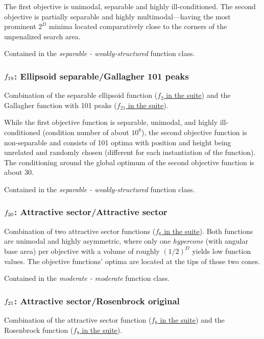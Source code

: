\documentclass[letterpaper,12pt,english]{article}
\begin{document}
The first objective is unimodal, separable and highly ill-conditioned.
The second objective is partially separable and highly multimodal---having
the most prominent \(2^D\) minima located comparatively close to the
corners of the unpenalized search area.

Contained in the \emph{separable - weakly-structured} function class.


\subsubsection{\protect\(f_{19}\protect\): Ellipsoid separable/Gallagher 101 peaks}
\label{index:ellipsoid-separable-gallagher-101-peaks}\label{index:f19}
Combination of the separable ellipsoid function (\href{http://coco.lri.fr/downloads/download15.03/bbobdocfunctions.pdf\#page=10}{\(f_2\) in the  suite}) and the Gallagher function with 101 peaks (\href{http://coco.lri.fr/downloads/download15.03/bbobdocfunctions.pdf\#page=105}{\(f_{21}\) in the  suite}).

While the first objective function is separable, unimodal, and
highly ill-conditioned (condition number of about \(10^6\)),
the second objective function is non-separable and consists
of 101 optima with position and height being unrelated and
randomly chosen (different for each instantiation of the function).
The conditioning around the global optimum of the second
objective function is about 30.

Contained in the \emph{separable - weakly-structured} function class.


\subsubsection{\protect\(f_{20}\protect\): Attractive sector/Attractive sector}
\label{index:f20}\label{index:attractive-sector-attractive-sector}
Combination of two attractive sector functions (\href{http://coco.lri.fr/downloads/download15.03/bbobdocfunctions.pdf\#page=30}{\(f_6\) in the  suite}).
Both functions are unimodal and highly asymmetric, where only one
\emph{hypercone} (with angular base area) per objective with a volume of
roughly \((1/2)^D\) yields low function values. The objective
functions' optima are located at the tips of those two cones.

Contained in the \emph{moderate - moderate} function class.


\subsubsection{\protect\(f_{21}\protect\): Attractive sector/Rosenbrock original}
\label{index:f21}\label{index:attractive-sector-rosenbrock-original}
Combination of the attractive sector function (\href{http://coco.lri.fr/downloads/download15.03/bbobdocfunctions.pdf\#page=30}{\(f_6\) in the  suite}) and the Rosenbrock function (\href{http://coco.lri.fr/downloads/download15.03/bbobdocfunctions.pdf\#page=40}{\(f_8\) in the  suite}).
\end{document}
